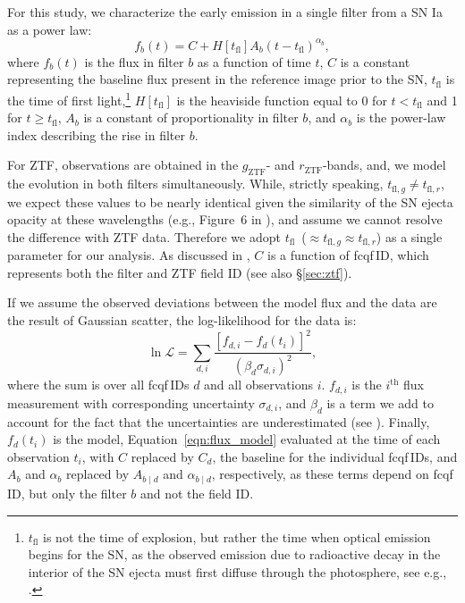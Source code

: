\documentclass[twocolumn]{./aastex63}
\newcommand{\rztf}{$r_\mathrm{ZTF}$}
\newcommand{\gztf}{$g_\mathrm{ZTF}$}
\newcommand{\tfl}{$t_\mathrm{fl}$}
\begin{document}
For this study, we characterize the early emission in a single filter from a
SN Ia as a power law:
%
\begin{equation}
    f_b(t) = C + H[t_\mathrm{fl}] A_b (t - t_\mathrm{fl})^{\alpha_b},
    \label{eqn:flux_model}
\end{equation}
%
where $f_b(t)$ is the flux in filter $b$ as a function of time $t$, $C$ is a
constant representing the baseline flux present in the reference image prior
to the SN, $t_\mathrm{fl}$ is the time of first light,\footnote{$t_\mathrm{fl}$ is not the time of
explosion, but rather the time when optical emission begins for the SN, as
the observed emission due to radioactive decay in the interior of the SN
ejecta must first diffuse through the photosphere, see e.g.,
\citet{Piro13,Piro14}.} $H[t_\mathrm{fl}]$ is the heaviside function equal
to 0 for $t < t_\mathrm{fl}$ and 1 for $t \ge t_\mathrm{fl}$, $A_b$ is a
constant of proportionality in filter $b$, and $\alpha_b$ is the power-law
index describing the rise in filter $b$.

For ZTF, observations are obtained in the \gztf- and \rztf-bands, and, we model
the evolution in both filters simultaneously. While, strictly speaking,
$t_{\mathrm{fl}, g} \ne t_{\mathrm{fl}, r}$, we expect these values to be nearly
identical given the similarity of the SN ejecta opacity at these wavelengths
(e.g., Figure~6 in \citealt{Magee18}), and assume we cannot resolve the
difference with ZTF data. Therefore we adopt \tfl\ ($\approx t_{\mathrm{fl}, g}
\approx t_{\mathrm{fl}, r}$) as a single parameter for our analysis. 
As discussed in \citet{Yao19}, $C$ is a function of fcqf\,ID, which represents
both the filter and ZTF field ID (see also \S\ref{sec:ztf}).

If we assume the observed deviations between the model flux and the data are the
result of Gaussian scatter, the log-likelihood for the data is:
%
\begin{equation}
    \ln \mathscr{L} = \sum_{d,i} \frac{[f_{d,i} - f_d(t_i)]^2}{(\beta_d \sigma_{d,i})^2},
\end{equation}
%
where the sum is over all fcqf\,IDs $d$ and all observations $i$. $f_{d,i}$
is the $i^\mathrm{th}$ flux measurement with corresponding uncertainty
$\sigma_{d,i}$, and $\beta_d$ is a term we add to account for the fact that
the uncertainties are underestimated (see \citealt{Yao19}). Finally,
$f_d(t_i)$ is the model, Equation~\ref{eqn:flux_model} evaluated at the time
of each observation $t_i$, with $C$ replaced by $C_d$, the baseline for the
individual fcqf\,IDs, and $A_b$ and $\alpha_b$ replaced by $A_{b\mid d}$ and
$\alpha_{b\mid d}$, respectively, as these terms depend on fcqf\,ID, but
only the filter $b$ and not the field ID.
\end{document}
